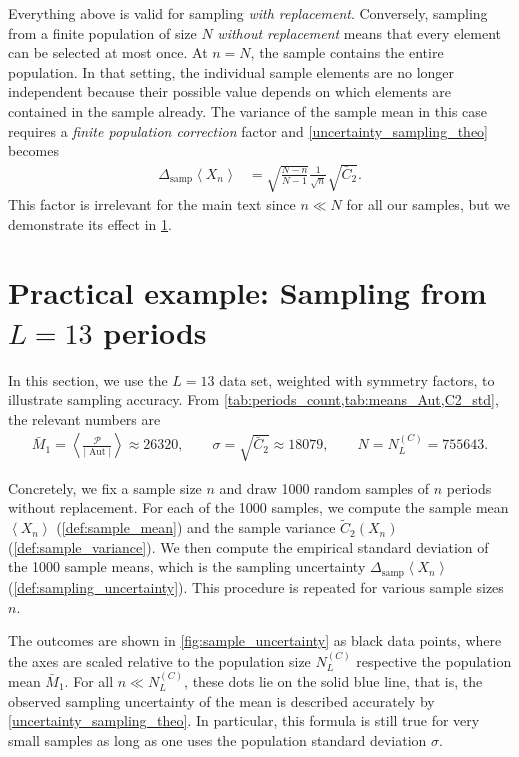 \documentclass[12pt,a4paper]{article}
\newcommand{\abs}[1]{\lvert #1 \rvert}
\newcommand{\period}{\mathcal P}
\newcommand{\Aut}{\operatorname{Aut}}
\renewcommand{\|}{\rule[-0.4ex]{0.2ex}{1.2em}}
\begin{document}
Everything above is valid for sampling \emph{with replacement}. Conversely, sampling from a finite population of size $N$ \emph{without replacement} means that every element can be selected at most once. At $n=N$, the sample contains the entire population. In that setting, the individual sample elements are no longer independent because their possible value depends on which elements are contained in the sample already.  The variance of the sample mean in this case requires a \emph{finite population correction} factor  \cite{davison_bootstrap_1997} and \cref{uncertainty_sampling_theo} becomes
\begin{align}\label{uncertainty_sampling2} 
	\Delta_{\text{samp}} \left \langle X_n \right \rangle  &= \sqrt{\frac{N -n}{N -1}} \frac{1}{\sqrt n } \sqrt{\bar C_2}.
\end{align}
This factor is irrelevant for the main text since $n\ll N$ for all our samples, but we demonstrate its effect in \cref{sec:sampling_example}.


\section{Practical example: Sampling from $L=13$ periods} \label{sec:sampling_example}
In this section, we use the $L=13$ data set, weighted with symmetry factors, to illustrate sampling accuracy.  From \cref{tab:periods_count,tab:means_Aut,C2_std}, the relevant numbers are
\begin{align*}
	\bar M_1=  \left \langle 	\frac{\period}{\abs{\Aut}} \right \rangle  \approx26320 , \qquad \sigma =\sqrt{\bar C_2}\approx 18079, \qquad N=N^{(C)}_L=755643.
\end{align*}

Concretely, we fix a sample size $n$ and draw 1000 random samples of $n$ periods without replacement. For each of the 1000 samples, we compute the sample mean $ \left \langle  X_n  \right \rangle  $ (\cref{def:sample_mean}) and the sample variance $\tilde C_2(X_n)$ (\cref{def:sample_variance}). We then compute the empirical standard deviation of the 1000 sample means, which is the sampling uncertainty $\Delta_{\text{samp}} \left \langle X_n \right \rangle $ (\cref{def:sampling_uncertainty}). This procedure is repeated for various sample sizes $n$. 



The outcomes are shown in \cref{fig:sample_uncertainty} as black data points, where the axes are scaled relative to the population size $N^{(C)}_L$ respective the population mean $\bar M_1$. For all $n \ll N^{(C)}_L$,   these dots lie on the solid blue line, that is, the observed sampling uncertainty of the mean is described accurately by \cref{uncertainty_sampling_theo}. In particular, this formula is still true for very small samples as long as one uses the population standard deviation $\sigma$. 
\end{document}
